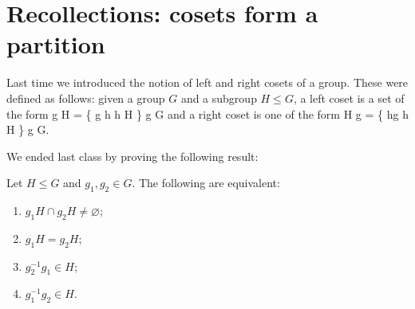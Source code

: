 \documentclass[reqno,11pt]{amsart}
\begin{document}
\makelecturetitle


\section{Recollections: cosets form a partition}

Last time we introduced the notion of left and right cosets of a group. These were defined as follows: given a group $G$ and a subgroup $H \leq G$, a left coset is a set of the form \be g H = \{ g h \mid h \in H \} \qquad {} g \in G \ee and a right coset is one of the form \be{} H g = \{ hg \mid h \in H \} \qquad {} g \in G. \ee

We ended last class by proving the following result:

\begin{lemma}\label{lem:coset-equality}
	Let $H\leq G$ and $g_1,g_2\in G$. The following are equivalent:
	\begin{enumerate}[label=\textbf{(\arabic*)}]
		\item $g_1H\cap g_2H\neq\varnothing$;
		\item $g_1H=g_2H$;
		\item $g_2^{-1}g_1\in H$;
		\item $g_1^{-1}g_2\in H$.
	\end{enumerate}
\end{lemma}
%	
\end{document}
